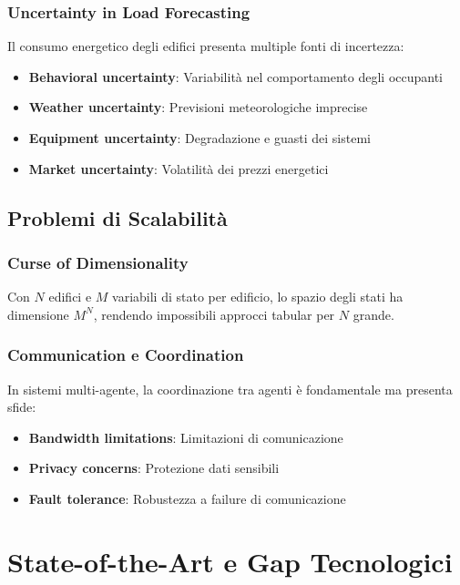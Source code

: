 \documentclass[12pt,a4paper,twoside]{report}
\begin{document}
\subsubsection{Uncertainty in Load Forecasting}

Il consumo energetico degli edifici presenta multiple fonti di incertezza:

\begin{itemize}
    \item \textbf{Behavioral uncertainty}: Variabilità nel comportamento degli occupanti
    \item \textbf{Weather uncertainty}: Previsioni meteorologiche imprecise
    \item \textbf{Equipment uncertainty}: Degradazione e guasti dei sistemi
    \item \textbf{Market uncertainty}: Volatilità dei prezzi energetici
\end{itemize}

\subsection{Problemi di Scalabilità}

\subsubsection{Curse of Dimensionality}

Con $N$ edifici e $M$ variabili di stato per edificio, lo spazio degli stati ha dimensione $M^N$, rendendo impossibili approcci tabular per $N$ grande.

\subsubsection{Communication e Coordination}

In sistemi multi-agente, la coordinazione tra agenti è fondamentale ma presenta sfide:
\begin{itemize}
    \item \textbf{Bandwidth limitations}: Limitazioni di comunicazione
    \item \textbf{Privacy concerns}: Protezione dati sensibili
    \item \textbf{Fault tolerance}: Robustezza a failure di comunicazione
\end{itemize}

\section{State-of-the-Art e Gap Tecnologici}
\end{document}
